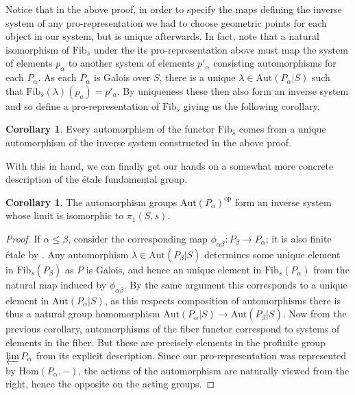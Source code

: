 \documentclass{article}
\theoremstyle{definition}
\newtheorem{corollary}[theorem]{Corollary}
\theoremstyle{remark}
\theoremstyle{plain}
\begin{document}
Notice that in the above proof, in order to specify the maps defining the inverse system of any pro-representation we had to choose geometric points for each object in our system, but is unique afterwards.
In fact, note that a natural isomorphism of $\text{Fib}_{\overline{s}}$ under the its pro-representation above must map the system of elements $p_{\alpha}$ to another system of elements $p'_{\alpha}$ consisting automorphisms for each $P_{\alpha}$.
As each $P_{\alpha}$ is Galois over $S$, there is a unique $ \lambda \in \text{Aut}(P_{\alpha}|S)$ such that $\text{Fib}_{\overline{s}}(\lambda)(p_a) = p'_a$.
By uniqueness these then also form an inverse system and so define a pro-representation of $\text{Fib}_{\overline{s}}$ giving us the following corollary.

\begin{corollary}
	Every automorphism of the functor $\text{Fib}_{\overline{s}}$ comes from a unique automorphism of the inverse system constructed in the above proof.
\end{corollary}

With this in hand, we can finally get our hands on a somewhat more concrete description of the \'etale fundamental group.

\begin{corollary}
	The automorphism groups $\text{Aut}(P_{\alpha})^{\text{op}}$ form an inverse system whose limit is isomorphic to $\pi_1(S, \overline{s})$.
\end{corollary}

\begin{proof}
	
	If $\alpha \leq \beta$, consider the corresponding map $\phi_{\alpha \beta}: P_{\beta} \to P_{\alpha}$; it is also finite \'etale by .
	Any automorphism $\lambda \in \text{Aut}(P_{\beta}|S)$ determines some unique element in $\text{Fib}_{\overline{s}}(P_{\beta})$ as $P$ is Galois, and hence an unique element in $\text{Fib}_{\overline{s}}(P_{\alpha})$ from the natural map induced by $\phi_{\alpha \beta}$.
By the same argument this corresponds to a unique element in $\text{Aut}(P_{\alpha}|S)$, as this respects composition of automorphisms there is thus a natural group homomorphism $\text{Aut}(P_{\alpha}|S) \to \text{Aut}(P_{\beta}|S)$.
Now from the previous corollary, automorphisms of the fiber functor correspond to systems of elements in the fiber.
But these are precisely elements in the profinite group $\varprojlim P_{\alpha}$ from its explicit description.
Since our pro-representation was represented by $\text{Hom}(P_{\alpha}, -)$, the actions of the automorphism are naturally viewed from the right, hence the opposite on the acting groups.
\end{proof}
\end{document}
